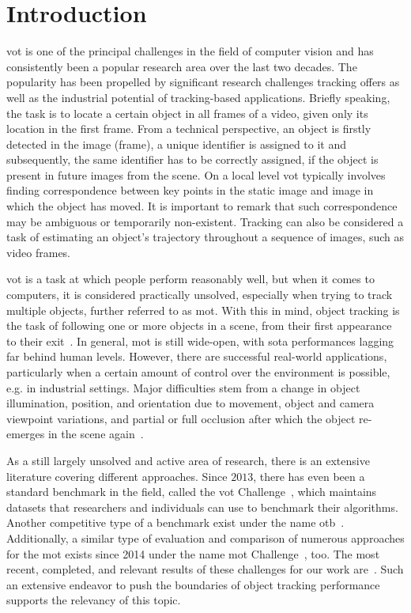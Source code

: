 \chapter{Introduction}
\label{chap:Introduction}

\Gls{vot} is one of the principal challenges in the field of computer vision and has consistently been a popular research area over the last two decades. The popularity has been propelled by significant research challenges tracking offers as well as the industrial potential of tracking-based applications. Briefly speaking, the task is to locate a certain object in all frames of a video, given only its location in the first frame. From a technical perspective, an object is firstly detected in the image (frame), a unique identifier is assigned to it and subsequently, the same identifier has to be correctly assigned, if the object is present in future images from the scene. On a local level \gls{vot} typically involves finding correspondence between key points in the static image and image in which the object has moved. It is important to remark that such correspondence may be ambiguous or temporarily non-existent. Tracking can also be considered a task of estimating an object’s trajectory throughout a sequence of images, such as video frames.

\Gls{vot} is a task at which people perform reasonably well, but when it comes to computers, it is considered practically unsolved, especially when trying to track multiple objects, further referred to as \gls{mot}. With this in mind, object tracking is the task of following one or more objects in a scene, from their first appearance to their exit~\cite{forsyth2002computer}. In general, \gls{mot} is still wide-open, with \gls{sota} performances lagging far behind human levels. However, there are successful real-world applications, particularly when a certain amount of control over the environment is possible, e.g. in industrial settings. Major difficulties stem from a change in object illumination, position, and orientation due to movement, object and camera viewpoint variations, and partial or full occlusion after which the object re-emerges in the scene again~\cite{Jalal2012}.

As a still largely unsolved and active area of research, there is an extensive literature covering different approaches. Since $2013$, there has even been a standard benchmark in the field, called the \gls{vot} Challenge~\cite{votchallenge}, which maintains datasets that researchers and individuals can use to benchmark their algorithms. Another competitive type of a benchmark exist under the name \gls{otb}~\cite{objecttrackingbenchmark}. Additionally, a similar type of evaluation and comparison of numerous approaches for the \gls{mot} exists since 2014 under the name \gls{mot} Challenge~\cite{motchallenge}, too. The most recent, completed, and relevant results of these challenges for our work are~\cite{Kristan2018, Kristan2019a, Dendorfer2019}. Such an extensive endeavor to push the boundaries of object tracking performance supports the relevancy of this topic.

